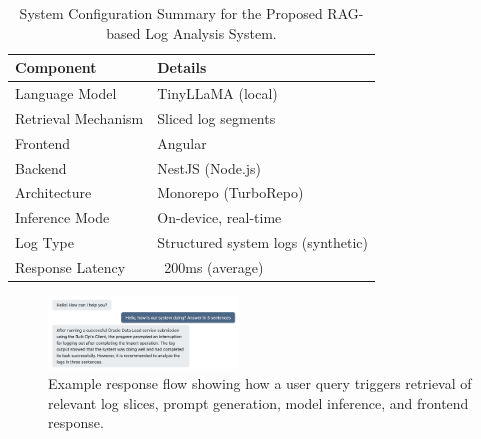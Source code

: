 \documentclass[conference]{IEEEtran}
\begin{document}
\begin{table}[!ht]

\centering

\caption{System Configuration Summary for the Proposed RAG-based Log Analysis System.}

\label{tab:SystemConfig}

\begin{tabular}{|l|l|}

\hline

\textbf{Component} & \textbf{Details} \\

\hline

Language Model & TinyLLaMA (local) \\

Retrieval Mechanism & Sliced log segments \\

Frontend & Angular \\

Backend & NestJS (Node.js) \\

Architecture & Monorepo (TurboRepo) \\

Inference Mode & On-device, real-time \\

Log Type & Structured system logs (synthetic) \\

Response Latency & ~200ms (average) \\

\hline

\end{tabular}

\end{table}



\begin{figure}[!ht]

\centering

\includegraphics[width=0.45\textwidth]{figures/response-sample.png}

\caption{Example response flow showing how a user query triggers retrieval of relevant log slices, prompt generation, model inference, and frontend response.}

\label{Fig:ResponseSample}

\end{figure}
\end{document}
